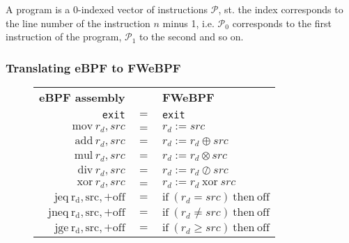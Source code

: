 

A program is a 0-indexed vector of instructions $\mathcal{P}$, st. the index corresponds to the line number of the instruction $n$ minus 1, i.e. $\mathcal{P}_0$ corresponds to the first instruction of the program, $\mathcal{P}_1$ to the second and so on.

\subsubsection{Translating eBPF to FWeBPF}

\begin{figure}[H]
  \centering
  \begin{tabular}{rcl}
    \textbf{eBPF assembly} & & \textbf{FWeBPF} \\
    \texttt{exit} & $=$ & \texttt{exit} \\
    $\mathrm{mov} ~ r_d, src$ & $=$ & $r_d := src$ \\
    $\mathrm{add} ~ r_d, src$ & $=$ & $r_d := r_d \oplus src$ \\
    $\mathrm{mul} ~ r_d, src$ & $=$ & $r_d := r_d \otimes src$ \\        
    $\mathrm{div} ~ r_d, src$ & $=$ & $r_d := r_d \oslash src$ \\
    $\mathrm{xor} ~ r_d, src$ & $=$ & $r_d := r_d ~ \mathrm{xor} ~ src$ \\            
    $\mathrm{jeq ~ r_d, src, +off}$ & $=$ & $\mathrm{if} ~ (r_d = src) ~ \mathrm{then} ~ \mathrm{off}$ \\
    $\mathrm{jneq ~ r_d, src, +off}$ & $=$ & $\mathrm{if} ~ (r_d \neq src) ~ \mathrm{then} ~ \mathrm{off}$ \\
    $\mathrm{jge ~ r_d, src, +off}$ & $=$ & $\mathrm{if} ~ (r_d \geq src) ~ \mathrm{then} ~ \mathrm{off}$    \\    
\end{tabular}
\end{figure}

